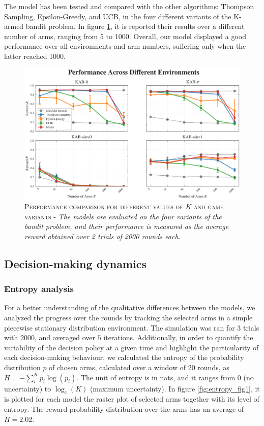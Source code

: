 The model has been tested and compared with the other algorithms: Thompson Sampling, Epsilon-Greedy, and UCB, in the four different variants of the K-armed bandit problem.
In figure \ref{fig:perf_plot}, it is reported their results over a different number of arms, ranging from 5 to 1000.
Overall, our model displayed a good performance over all environments and arm numbers, suffering only when the latter reached 1000.

\begin{figure}[H]
    \centering
    \includegraphics[width=1.\textwidth]{figures/performance_plot.png}
    \caption{\textsc{Performance comparison for different values of $K$ and game variants} - \textit{The models are evaluated on the four variants of the bandit problem, and their performance is measured as the average reward obtained over 2 trials of 2000 rounds each.}}
    \label{fig:perf_plot}
\end{figure}


\subsection{Decision-making dynamics}

\subsubsection{Entropy analysis}\label{sec:entropy}
\noindent For a better understanding of the qualitative differences between the models, we analyzed the progress over the rounds by tracking the selected arms in a simple piecewise stationary distribution environment.
The simulation was ran for $3$ trials with $2000$, and averaged over $5$ iterations.
Additionally, in order to quantify the variability of the decision policy at a given time and highlight the particularity of each decision-making behaviour, we calculated the entropy of the probability distribution $p$ of chosen arms, calculated over a window of 20 rounds, as $H=-\sum^{K}_{i} p_{i}\log(p_{i})$.
The unit of entropy is in nats, and it ranges from $0$ (no uncertainty) to $\log_{e}(K)$ (maximum uncertainty).
In figure \ref{fig:entropy_fig1}, it is plotted for each model the raster plot of selected arms together with its level of entropy. The reward probability distribution over the arms has an average of $H=2.02$.

